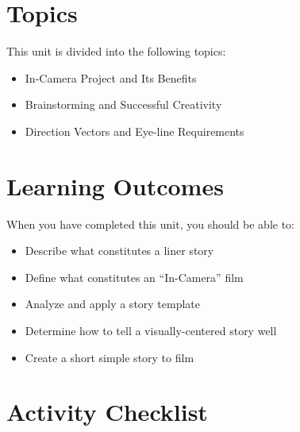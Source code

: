 \documentclass[
]{book}
\providecommand{\tightlist}{%
  \setlength{\itemsep}{0pt}\setlength{\parskip}{0pt}}
\begin{document}
\hypertarget{topics-5}{%
\section*{Topics}\label{topics-5}}

This unit is divided into the following topics:

\begin{itemize}
\tightlist
\item
  In-Camera Project and Its Benefits
\item
  Brainstorming and Successful Creativity
\item
  Direction Vectors and Eye-line Requirements
\end{itemize}

\hypertarget{learning-outcomes-5}{%
\section*{Learning Outcomes}\label{learning-outcomes-5}}

When you have completed this unit, you should be able to:

\begin{itemize}
\tightlist
\item
  Describe what constitutes a liner story\\
\item
  Define what constitutes an ``In-Camera'' film\\
\item
  Analyze and apply a story template\\
\item
  Determine how to tell a visually-centered story well\\
\item
  Create a short simple story to film
\end{itemize}

\hypertarget{activity-checklist-5}{%
\section*{Activity Checklist}\label{activity-checklist-5}}
\end{document}
